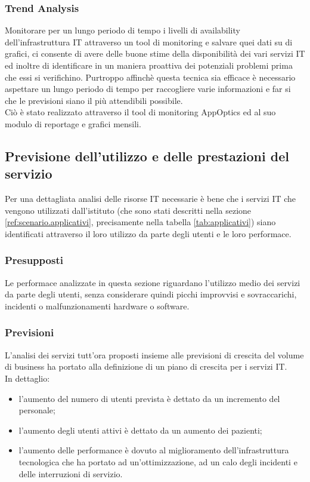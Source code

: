 \subsubsection{Trend Analysis}
Monitorare per un lungo periodo di tempo i livelli di availability dell'infrastruttura IT attraverso un tool di monitoring e salvare quei dati su di grafici, ci consente di avere delle buone stime della disponibilità dei vari servizi IT ed inoltre di identificare in un maniera proattiva dei potenziali problemi prima che essi si verifichino. Purtroppo affinchè questa tecnica sia efficace è necessario aspettare un lungo periodo di tempo per raccogliere varie informazioni e far si che le previsioni siano il più attendibili possibile.\\
Ciò è stato realizzato attraverso il tool di monitoring AppOptics ed al suo modulo di reportage e grafici mensili.
\subsection{Previsione dell'utilizzo e delle prestazioni del servizio}
	Per una dettagliata analisi delle risorse IT necessarie è bene che i servizi IT che vengono utilizzati dall'istituto (che sono stati descritti nella sezione \ref{ref:scenario.applicativi}, precisamente nella tabella \ref{tab:applicativi}) siano identificati attraverso il loro utilizzo da parte degli utenti e le loro performace. \\

	\subsubsection{Presupposti}
	Le performace analizzate in questa sezione riguardano l'utilizzo medio dei servizi da parte degli utenti, senza considerare quindi picchi improvvisi e sovraccarichi, incidenti o malfunzionamenti hardware o software. \\
	\subsubsection{Previsioni}
	L'analisi dei servizi tutt'ora proposti insieme alle previsioni di crescita del volume di business ha portato alla definizione di un piano di crescita per i servizi IT.\\
	In dettaglio:
	\begin{itemize}
		\item l'aumento del numero di utenti prevista è dettato da un incremento del personale;
		\item l'aumento degli utenti attivi è dettato da un aumento dei pazienti;
		\item l'aumento delle performance è dovuto al miglioramento dell'infrastruttura tecnologica che ha portato ad un'ottimizzazione, ad un calo degli incidenti e delle interruzioni di servizio.
	\end{itemize}

